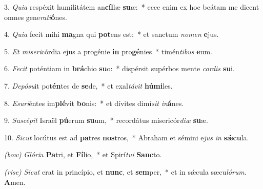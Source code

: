3. \textit{Quia} respéxit humilitátem an\textbf{cíl}læ \textbf{su}æ:~*
	ecce enim ex hoc beátam me dicent omnes gene\textit{ra}\textit{ti}\textbf{ó}nes.

4. \textit{Quia} fecit mihi \textbf{ma}gna qui \textbf{pot}ens est:~*
	et sanctum \textit{no}\textit{men} \textbf{e}jus.

5. \textit{Et miseri}córdia ejus a progénie \textbf{in} pro\textbf{gé}nies~*
	timén\textit{ti}\textit{bus} \textbf{e}um.

6. \textit{Fecit} poténtiam in \textbf{brá}chio \textbf{su}o:~*
	dispérsit supérbos mente \textit{cor}\textit{dis} \textbf{su}i.

7. \textit{Depósu}it pot\textbf{én}tes de \textbf{se}de,~*
	et exal\textit{tá}\textit{vit} \textbf{húmi}les.

8. \textit{Esuri}éntes im\textbf{plé}vit \textbf{bo}nis:~*
	et dívites dimí\textit{sit} \textit{in}\textbf{á}nes.

9. \textit{Suscépit} Israël \textbf{pú}erum \textbf{su}um,~*
	recordátus misericór\textit{di}\textit{æ} \textbf{su}æ.

10. \textit{Sicut} locútus est ad \textbf{pa}tres \textbf{nos}tros,~*
	Abraham et sémini e\textit{jus} \textit{in} \textbf{s\'{\ae}cu}la.

{\color{red}\textit{(bow)}} \textit{Glóri}a \textbf{Pa}tri, et \textbf{Fí}lio,~*
	et Spirí\textit{tu}\textit{i} \textbf{Sanc}to.

{\color{red}\textit{(rise)}} \textit{Sicut} erat in princípio, et \textbf{nunc}, et \textbf{sem}per,~*
	et in s\'{\ae}cula sæcu\textit{ló}\textit{rum}. \textbf{A}men.